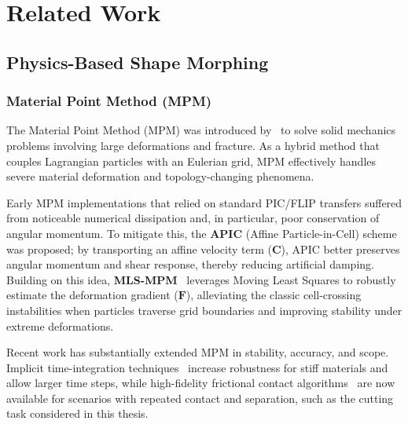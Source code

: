 
\clearpage %

\chapter{Related Work}\label{CH2_RelatedWork}

\section{Physics-Based Shape Morphing}
\subsection{Material Point Method (MPM)}
    The Material Point Method (MPM) was introduced by~\citep{sulsky1994particle} to solve solid mechanics problems involving large deformations and fracture. As a hybrid method that couples Lagrangian particles with an Eulerian grid, MPM effectively handles severe material deformation and topology-changing phenomena.
    
    Early MPM implementations that relied on standard PIC/FLIP transfers suffered from noticeable numerical dissipation and, in particular, poor conservation of angular momentum. To mitigate this, the \textbf{APIC} (Affine Particle-in-Cell) scheme~\citep{jiang2017angular} was proposed; by transporting an affine velocity term ($\mathbf{C}$), APIC better preserves angular momentum and shear response, thereby reducing artificial damping. Building on this idea, \textbf{MLS-MPM}~\citep{2018-MLSMPM} leverages Moving Least Squares to robustly estimate the deformation gradient ($\mathbf{F}$), alleviating the classic cell-crossing instabilities when particles traverse grid boundaries and improving stability under extreme deformations.
    
    Recent work has substantially extended MPM in stability, accuracy, and scope. Implicit time-integration techniques~\citep{implicit_mpm_surface_tension, wang2020hierarchical} increase robustness for stiff materials and allow larger time steps, while high-fidelity frictional contact algorithms~\citep{kakouris2024high} are now available for scenarios with repeated contact and separation, such as the cutting task considered in this thesis.
    
